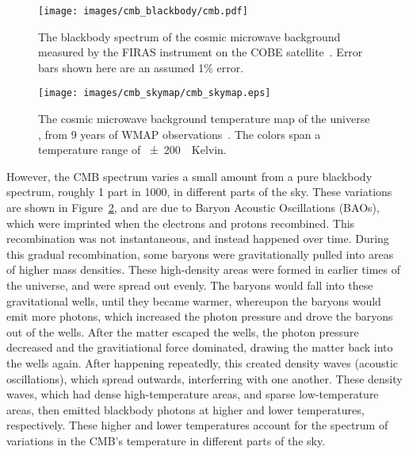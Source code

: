 \begin{figure}[!t]
  \centering
  \texttt{[image: images/cmb\_blackbody/cmb.pdf]}
  \caption[Cosmic Microwave Background Blackbody]{
    The blackbody spectrum of the cosmic microwave background measured by the FIRAS instrument on the COBE satellite~\cite{mather1990}.
    Error bars shown here are an assumed 1\% error.
  }
  \label{fig:cmb_black}
\end{figure}

\begin{figure}[ht]
  \centering
  \texttt{[image: images/cmb\_skymap/cmb\_skymap.eps]}
  \caption[Cosmic Microwave Background Skymap]{
    The cosmic microwave background temperature map of the universe \cite{wmap_skymap}, from 9 years of WMAP observations~\cite{wmap9year}.
    The colors span a temperature range of \SI{\pm200}{\mu{}Kelvin}.
  }
  \label{fig:cmb}
\end{figure}

However, the CMB spectrum varies a small amount from a pure blackbody spectrum, roughly 1 part in 1000, in different parts of the sky.
These variations are shown in Figure~\ref{fig:cmb}, and are due to Baryon Acoustic Oscillations (BAOs), which were imprinted when the electrons and protons recombined.
This recombination was not instantaneous, and instead happened over time.
During this gradual recombination, some baryons were gravitationally pulled into areas of higher mass densities.
These high-density areas were formed in earlier times of the universe, and were spread out evenly.
The baryons would fall into these gravitational wells, until they became warmer, whereupon the baryons would emit more photons, which increased the photon pressure and drove the baryons out of the wells.
After the matter escaped the wells, the photon pressure decreased and the gravitiational force dominated, drawing the matter back into the wells again.
After happening repeatedly, this created density waves (acoustic oscillations), which spread outwards, interferring with one another.
These density waves, which had dense high-temperature areas, and sparse low-temperature areas, then emitted blackbody photons at higher and lower temperatures, respectively.
These higher and lower temperatures account for the spectrum of variations in the CMB's temperature in different parts of the sky.

